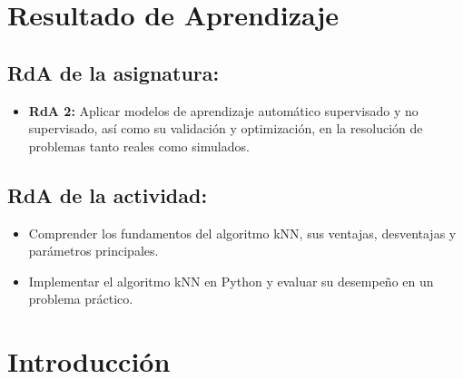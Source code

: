 \documentclass[a4,11pt]{aleph-notas}
\begin{document}
\encabezado


\section*{Resultado de Aprendizaje}

\subsection*{RdA de la asignatura:}
\begin{itemize}[leftmargin=*]
    \item \textbf{RdA 2:} Aplicar modelos de aprendizaje automático supervisado y no supervisado, así como su validación y optimización, en la resolución de problemas tanto reales como simulados.
\end{itemize}

\subsection*{RdA de la actividad:}
\begin{itemize}[leftmargin=*]
    \item Comprender los fundamentos del algoritmo kNN, sus ventajas, desventajas y parámetros principales.
    \item Implementar el algoritmo kNN en Python y evaluar su desempeño en un problema práctico.
\end{itemize}

\section*{Introducción}

\end{document}
